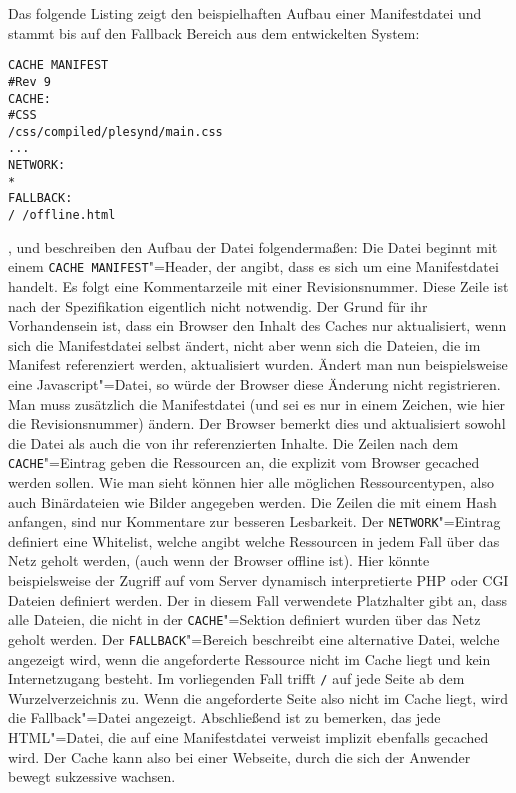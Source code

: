 Das folgende Listing zeigt den beispielhaften Aufbau einer Manifestdatei und stammt bis auf den Fallback Bereich aus dem entwickelten System:
\begin{lstlisting}
CACHE MANIFEST
#Rev 9
CACHE:
#CSS
/css/compiled/plesynd/main.css
...
NETWORK:
*
FALLBACK:
/ /offline.html
\end{lstlisting}

\cite{W3C2012}, \cite{html5upandrunning} und \cite{Bidelman2010} beschreiben den Aufbau der Datei folgendermaßen: Die Datei beginnt mit einem \texttt{CACHE MANIFEST}"=Header, der angibt, dass es sich um eine Manifestdatei handelt. Es folgt eine Kommentarzeile mit einer Revisionsnummer. Diese Zeile ist nach der Spezifikation eigentlich nicht notwendig. Der Grund für ihr Vorhandensein ist, dass ein Browser den Inhalt des Caches nur aktualisiert, wenn sich die Manifestdatei selbst ändert, nicht aber wenn sich die Dateien, die im Manifest referenziert werden, aktualisiert wurden. Ändert man nun beispielsweise eine Javascript"=Datei, so würde der Browser diese Änderung nicht registrieren. Man muss zusätzlich die Manifestdatei (und sei es nur in einem Zeichen, wie hier die Revisionsnummer) ändern. Der Browser bemerkt dies und aktualisiert sowohl die Datei als auch die von ihr referenzierten Inhalte. Die Zeilen nach dem \texttt{CACHE}"=Eintrag geben die Ressourcen an, die explizit vom Browser gecached werden sollen. Wie man sieht können hier alle möglichen Ressourcentypen, also auch Binärdateien wie Bilder angegeben werden. Die Zeilen die mit einem Hash anfangen, sind nur Kommentare zur besseren Lesbarkeit. Der \texttt{NETWORK}"=Eintrag definiert eine Whitelist, welche angibt welche Ressourcen in jedem Fall über das Netz geholt werden, (auch wenn der Browser offline ist). Hier könnte beispielsweise der Zugriff auf vom Server dynamisch interpretierte PHP oder CGI Dateien definiert werden. Der in diesem Fall verwendete Platzhalter gibt an, dass alle Dateien, die nicht in der \texttt{CACHE}"=Sektion definiert wurden über das Netz geholt werden. Der \texttt{FALLBACK}"=Bereich beschreibt eine alternative Datei, welche angezeigt wird, wenn die angeforderte Ressource nicht im Cache liegt und kein Internetzugang besteht. Im vorliegenden Fall trifft \texttt{/} auf jede Seite ab dem Wurzelverzeichnis zu. Wenn die angeforderte Seite also nicht im Cache liegt, wird die Fallback"=Datei angezeigt. Abschließend ist zu bemerken, das jede \ac{HTML}"=Datei, die auf eine Manifestdatei verweist implizit ebenfalls gecached wird. Der Cache kann also bei einer Webseite, durch die sich der Anwender bewegt sukzessive wachsen.

